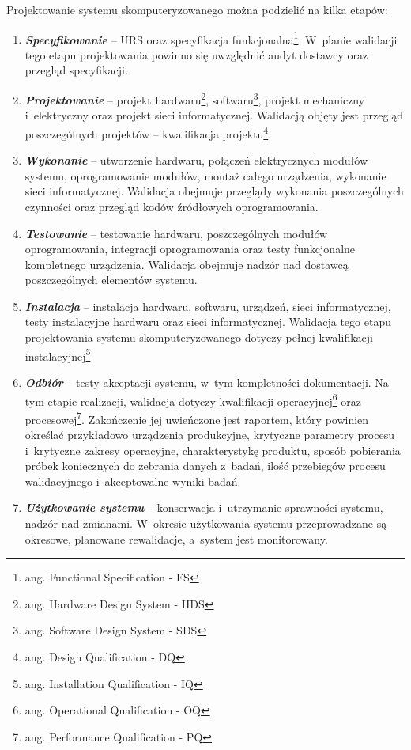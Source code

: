 \documentclass{xmgr}
\begin{document}
Projektowanie systemu skomputeryzowanego można podzielić na kilka etapów:

\begin{enumerate}
  \item \textbf{\textit{Specyfikowanie}} – URS oraz specyfikacja funkcjonalna\footnote{ang. Functional Specification - FS}. W~planie walidacji tego etapu projektowania powinno się uwzględnić audyt dostawcy oraz przegląd specyfikacji.
  \item \textbf{\textit{Projektowanie}} – projekt hardwaru\footnote{ang. Hardware Design System - HDS}, softwaru\footnote{ang. Software Design System - SDS}, projekt mechaniczny i~elektryczny oraz projekt sieci informatycznej. Walidacją objęty jest przegląd poszczególnych projektów – kwalifikacja projektu\footnote{ang. Design Qualification - DQ}.
  \item \textbf{\textit{Wykonanie}} – utworzenie hardwaru, połączeń elektrycznych modułów systemu, oprogramowanie modułów, montaż całego urządzenia, wykonanie sieci informatycznej. Walidacja obejmuje przeglądy wykonania poszczególnych czynności oraz przegląd kodów źródłowych oprogramowania.
\item \textbf{\textit{Testowanie}} – testowanie hardwaru, poszczególnych modułów oprogramowania,  integracji oprogramowania oraz testy funkcjonalne kompletnego urządzenia. Walidacja obejmuje nadzór nad dostawcą poszczególnych elementów systemu.
\item \textbf{\textit{Instalacja}} – instalacja hardwaru, softwaru, urządzeń, sieci informatycznej, testy instalacyjne hardwaru oraz sieci informatycznej. Walidacja tego etapu projektowania systemu skomputeryzowanego dotyczy pełnej kwalifikacji instalacyjnej\footnote{ang. Installation Qualification - IQ}
\item \textbf{\textit{Odbiór}} – testy akceptacji systemu, w~tym kompletności dokumentacji. Na tym etapie realizacji, walidacja dotyczy kwalifikacji operacyjnej\footnote{ang. Operational Qualification - OQ} oraz procesowej\footnote{ang. Performance Qualification - PQ}. Zakończenie jej uwieńczone jest raportem, który powinien określać przykładowo urządzenia produkcyjne, krytyczne parametry procesu i~krytyczne zakresy operacyjne, charakterystykę produktu, sposób pobierania próbek koniecznych do zebrania danych z~badań, ilość przebiegów procesu walidacyjnego i~akceptowalne wyniki badań.
\item \textbf{\textit{Użytkowanie systemu}} – konserwacja i~utrzymanie sprawności systemu, nadzór nad zmianami. W~okresie użytkowania systemu przeprowadzane są okresowe, planowane rewalidacje, a~system jest monitorowany.\cite{LAB-EL2}
\end{enumerate}
\end{document}
